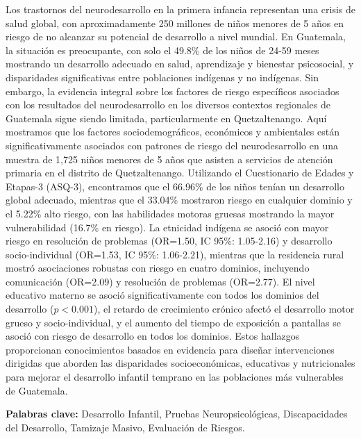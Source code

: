 Los trastornos del neurodesarrollo en la primera infancia representan una 
crisis de salud global, con aproximadamente 250 millones de niños menores de 5 
años en riesgo de no alcanzar su potencial de desarrollo a nivel mundial. En 
Guatemala, la situación es preocupante, con solo el 49.8\% de los 
niños de 24-59 meses mostrando un desarrollo adecuado en salud, aprendizaje y 
bienestar psicosocial, y disparidades significativas entre poblaciones 
indígenas y no indígenas. Sin embargo, la evidencia integral sobre los factores 
de riesgo específicos asociados con los resultados del neurodesarrollo en los 
diversos contextos regionales de Guatemala sigue siendo limitada, 
particularmente en Quetzaltenango. Aquí mostramos que los 
factores sociodemográficos, económicos y ambientales están significativamente 
asociados con patrones de riesgo del neurodesarrollo en una muestra de 1,725 
niños menores de 5 años que asisten a servicios de atención primaria en el 
distrito de Quetzaltenango. Utilizando el Cuestionario de Edades y Etapas-3 
(ASQ-3), encontramos que el 66.96\% de los niños tenían un desarrollo global 
adecuado, mientras que el 33.04\% mostraron riesgo en cualquier dominio y el 
5.22\% alto riesgo, con las habilidades motoras gruesas mostrando la mayor 
vulnerabilidad (16.7\% en riesgo). La etnicidad indígena se asoció con mayor 
riesgo en resolución de problemas (OR=1.50, IC 95\%: 1.05-2.16) y desarrollo 
socio-individual (OR=1.53, IC 95\%: 1.06-2.21), mientras que la residencia 
rural mostró asociaciones robustas con riesgo en cuatro dominios, incluyendo 
comunicación (OR=2.09) y resolución de problemas (OR=2.77). El nivel educativo 
materno se asoció significativamente con todos los dominios del desarrollo 
($p<0.001$), el retardo de crecimiento crónico afectó el desarrollo motor 
grueso y socio-individual, y el aumento del tiempo de exposición a pantallas 
se asoció con riesgo de desarrollo en todos los dominios. Estos hallazgos 
proporcionan conocimientos basados en evidencia para diseñar intervenciones 
dirigidas que aborden las disparidades socioeconómicas, educativas y
nutricionales  para mejorar el desarrollo infantil temprano en las poblaciones
más  vulnerables de Guatemala.

\textbf{Palabras clave:} Desarrollo Infantil, Pruebas Neuropsicológicas, 
Discapacidades del Desarrollo, Tamizaje Masivo, Evaluación de Riesgos.
